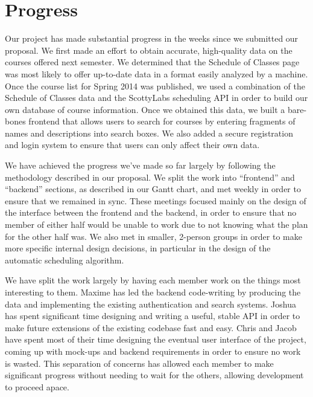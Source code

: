 \section{Progress}

Our project has made substantial progress in the weeks since we submitted our proposal.
We first made an effort to obtain accurate, high-quality data on the courses offered next semester.
We determined that the Schedule of Classes page was most likely to offer up-to-date data in a 
format easily analyzed by a machine. Once the course list for Spring 2014 was published, we used
a combination of the Schedule of Classes data and the ScottyLabs scheduling API in order to build
our own database of course information. Once we obtained this data, we built a bare-bones frontend
that allows users to search for courses by entering fragments of names and descriptions into search
boxes. We also added a secure registration and login system to ensure that users can only affect
their own data.

We have achieved the progress we've made so far largely by following the methodology described in 
our proposal. We split the work into ``frontend'' and ``backend'' sections, as described in our
Gantt chart, and met weekly in order to ensure that we remained in sync. These meetings focused
mainly on the design of the interface between the frontend and the backend, in order to ensure
that no member of either half would be unable to work due to not knowing what the plan for the
other half was. We also met in smaller, 2-person groups in order to make more specific internal
design decisions, in particular in the design of the automatic scheduling algorithm.

We have split the work largely by having each member work on the things most interesting to them.
Maxime has led the backend code-writing by producing the data and implementing the existing
authentication and search systems. Joshua has spent significant time designing and writing a
useful, stable API in order to make future extensions of the existing codebase fast and easy.
Chris and Jacob have spent most of their time designing the eventual user interface of the project,
coming up with mock-ups and backend requirements in order to ensure no work is wasted. This separation
of concerns has allowed each member to make significant progress without needing to wait for
the others, allowing development to proceed apace.